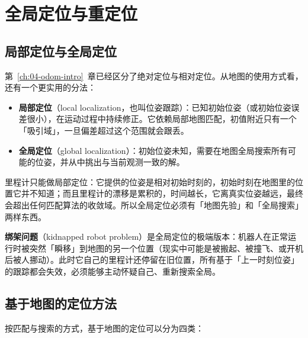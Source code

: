 \chapter{全局定位与重定位}\label{ch:10-global-loc}


\section{局部定位与全局定位}\label{sec:10-local-global}

第~\ref{ch:04-odom-intro}~章已经区分了绝对定位与相对定位。从地图的使用方式看，还有一个更实用的分法：

\begin{itemize}
  \item \textbf{局部定位}（local localization，也叫位姿跟踪）：已知初始位姿（或初始位姿误差很小），在运动过程中持续修正。它依赖局部地图匹配，初值附近只有一个「吸引域」，一旦偏差超过这个范围就会跟丢。
  \item \textbf{全局定位}（global localization）：初始位姿未知，需要在地图全局搜索所有可能的位姿，并从中挑出与当前观测一致的解。
\end{itemize}

里程计只能做局部定位：它提供的位姿是相对初始时刻的，初始时刻在地图里的位置它并不知道；而且里程计的漂移是累积的，时间越长，它离真实位姿越远，最终会超出任何匹配算法的收敛域。所以全局定位必须有「地图先验」和「全局搜索」两样东西。

\textbf{绑架问题}（kidnapped robot problem）是全局定位的极端版本：机器人在正常运行时被突然「瞬移」到地图的另一个位置（现实中可能是被搬起、被撞飞、或开机后被人挪动）。此时它自己的里程计还停留在旧位置，所有基于「上一时刻位姿」的跟踪都会失效，必须能够主动怀疑自己、重新搜索全局。

\section{基于地图的定位方法}\label{sec:10-methods}

按匹配与搜索的方式，基于地图的定位可以分为四类：

